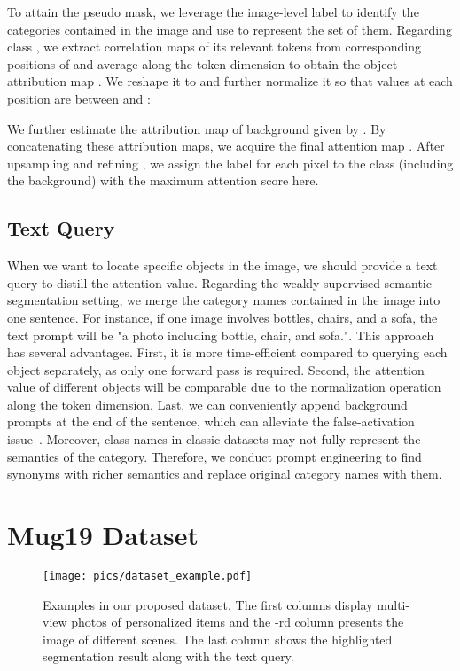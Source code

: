 \documentclass[letterpaper]{article} \usepackage[submission]{aaai24}  \usepackage{times}  \usepackage{helvet}  \usepackage{courier}  \usepackage[hyphens]{url}  \usepackage{graphicx} \urlstyle{rm} \def\UrlFont{\rm}  \usepackage{natbib}  \usepackage{caption} \frenchspacing  \setlength{\pdfpagewidth}{8.5in} \setlength{\pdfpageheight}{11in} \usepackage{algorithm}
\begin{document}
To attain the pseudo mask, we leverage the image-level label to identify the categories contained in the image and use  to represent the set of them.
Regarding class , we extract correlation maps of its relevant tokens from corresponding positions of  and average along the token dimension to obtain the object attribution map .
We reshape it to  and further normalize it so that values at each position are between  and :

We further estimate the attribution map of background given by .
By concatenating these attribution maps, we acquire the final attention map .
After upsampling and refining , we assign the label for each pixel to the class (including the background) with the maximum attention score here.


\subsection{Text Query}
\label{sec:query}

When we want to locate specific objects in the image, we should provide a text query to distill the attention value.
Regarding the weakly-supervised semantic segmentation setting, we merge the category names contained in the image into one sentence.
For instance, if one image involves bottles, chairs, and a sofa, the text prompt will be "a photo including bottle, chair, and sofa.".
This approach has several advantages.
First, it is more time-efficient compared to querying each object separately, as only one forward pass is required.
Second, the attention value of different objects will be comparable due to the normalization operation along the token dimension.
Last, we can conveniently append background prompts at the end of the sentence, which can alleviate the false-activation issue~\cite{clims}.
Moreover, class names in classic datasets may not fully represent the semantics of the category.
Therefore, we conduct prompt engineering to find synonyms with richer semantics and replace original category names with them.

\section{Mug19 Dataset}
\label{sec:dataset}

\begin{figure}
  \centering
  \texttt{[image: pics/dataset\_example.pdf]}
  \caption{
  Examples in our proposed dataset.
  The first  columns display multi-view photos of personalized items and the -rd column presents the image of different scenes.
  The last column shows the highlighted segmentation result along with the text query.
}
\label{fig:dataset}
\end{figure}
\end{document}
